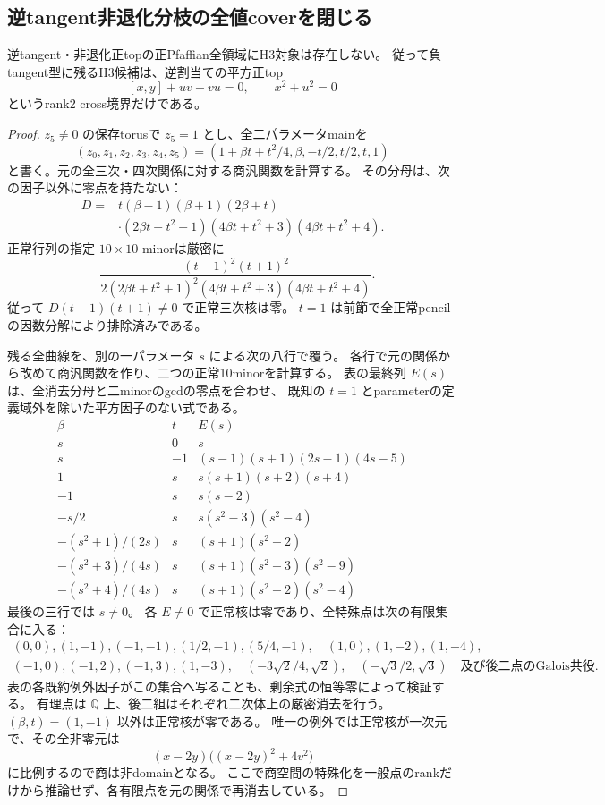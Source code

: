 \subsection{逆tangent非退化分枝の全値coverを閉じる}
\begin{theorem}\label{thm:h3-order2-22-reverse-plus-empty}
逆tangent・非退化正topの正Pfaffian全領域にH3対象は存在しない。
従って負tangent型に残るH3候補は、逆割当ての平方正top
\[
 [x,y]+uv+vu=0,\qquad x^2+u^2=0
\]
というrank2 cross境界だけである。
\end{theorem}
\begin{proof}
$z_5\ne0$ の保存torusで $z_5=1$ とし、全二パラメータmainを
\[
 (z_0,z_1,z_2,z_3,z_4,z_5)
 =(1+\beta t+t^2/4,\beta,-t/2,t/2,t,1)
\]
と書く。元の全三次・四次関係に対する商汎関数を計算する。
その分母は、次の因子以外に零点を持たない：
\[
 \begin{split}
 D={}&t(\beta-1)(\beta+1)(2\beta+t)\\
 &\cdot(2\beta t+t^2+1)(4\beta t+t^2+3)(4\beta t+t^2+4).
 \end{split}
\]
正常行列の指定 $10\times10$ minorは厳密に
\[
 -\frac{(t-1)^2(t+1)^2}
 {2(2\beta t+t^2+1)^2(4\beta t+t^2+3)(4\beta t+t^2+4)}.
\]
従って $D(t-1)(t+1)\ne0$ で正常三次核は零。
$t=1$ は前節で全正常pencilの因数分解により排除済みである。

残る全曲線を、別の一パラメータ $s$ による次の八行で覆う。
各行で元の関係から改めて商汎関数を作り、二つの正常10minorを計算する。
表の最終列 $E(s)$ は、全消去分母と二minorのgcdの零点を合わせ、
既知の $t=1$ とparameterの定義域外を除いた平方因子のない式である。
\[
\begin{array}{c|c|l}
 \beta&t&E(s)\\\hline
 s&0&s\\
 s&-1&(s-1)(s+1)(2s-1)(4s-5)\\
 1&s&s(s+1)(s+2)(s+4)\\
 -1&s&s(s-2)\\
 -s/2&s&s(s^2-3)(s^2-4)\\
 -(s^2+1)/(2s)&s&(s+1)(s^2-2)\\
 -(s^2+3)/(4s)&s&(s+1)(s^2-3)(s^2-9)\\
 -(s^2+4)/(4s)&s&(s+1)(s^2-2)(s^2-4)
\end{array}
\]
最後の三行では $s\ne0$。
各 $E\ne0$ で正常核は零であり、全特殊点は次の有限集合に入る：
\[
\begin{gathered}
 (0,0),(1,-1),(-1,-1),(1/2,-1),(5/4,-1),\quad
 (1,0),(1,-2),(1,-4),\\
 (-1,0),(-1,2),(-1,3),(1,-3),\quad
 (-3\sqrt2/4,\sqrt2),\quad(-\sqrt3/2,\sqrt3)
 \quad\text{及び後二点のGalois共役}.
\end{gathered}
\]
表の各既約例外因子がこの集合へ写ることも、剰余式の恒等零によって検証する。
有理点は $\mathbb Q$ 上、後二組はそれぞれ二次体上の厳密消去を行う。
$(\beta,t)=(1,-1)$ 以外は正常核が零である。
唯一の例外では正常核が一次元で、その全非零元は
\[
 (x-2y)\bigl((x-2y)^2+4v^2\bigr)
\]
に比例するので商は非domainとなる。
ここで商空間の特殊化を一般点のrankだけから推論せず、各有限点を元の関係で再消去している。


\end{proof}
